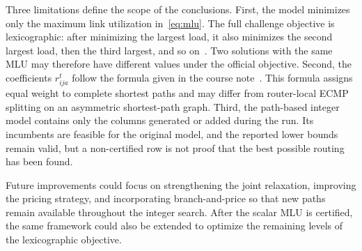 Three limitations define the scope of the conclusions. First, the model minimizes only the maximum
link utilization in~\eqref{eq:mlu}. The full challenge objective is lexicographic: after minimizing the
largest load, it also minimizes the second largest load, then the third largest, and so
on~\citep{orange2026}. Two solutions with the same MLU may therefore have different values under the
official objective. Second, the coefficients $r^t_{ija}$ follow the formula given in the course
note~\citep{courser2026}. This formula assigns equal weight to complete shortest paths and may differ
from router-local ECMP splitting on an asymmetric shortest-path graph. Third, the path-based integer
model contains only the columns generated or added during the run. Its incumbents are feasible for the
original model, and the reported lower bounds remain valid, but a non-certified row is not proof that
the best possible routing has been found.

Future improvements could focus on strengthening the joint relaxation, improving the pricing strategy,
and incorporating branch-and-price so that new paths remain available throughout the integer search.
After the scalar MLU is certified, the same framework could also be extended to optimize the remaining
levels of the lexicographic objective.
